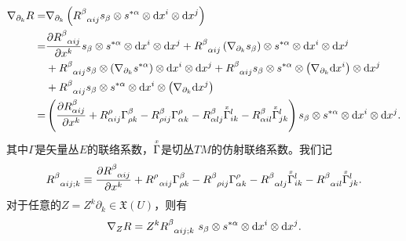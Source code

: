 \begin{align*}
	\nabla_{\partial_k} R = & \nabla_{\partial_k}\left(	R_{\hphantom{\alpha}\alpha i j}^\beta 
	s_\beta \otimes s^{*\alpha}\otimes {\rm d}x^i \otimes {\rm d}x^j \right) \\
	=& \frac{\partial R_{\hphantom{\alpha}\alpha i j}^\beta }{\partial x^k}
	s_\beta \otimes s^{*\alpha}\otimes {\rm d}x^i \otimes {\rm d}x^j 
	+ R_{\hphantom{\alpha}\alpha i j}^\beta \left( \nabla_{\partial_k} s_\beta \right)
	\otimes s^{*\alpha}\otimes {\rm d}x^i \otimes {\rm d}x^j \\
	& + R_{\hphantom{\alpha}\alpha i j}^\beta s_\beta \otimes 
	\left( \nabla_{\partial_k} s^{*\alpha} \right) \otimes {\rm d}x^i \otimes {\rm d}x^j 
	+ R_{\hphantom{\alpha}\alpha i j}^\beta s_\beta \otimes s^{*\alpha}\otimes  
	\left( \nabla_{\partial_k} {\rm d}x^i \right) \otimes  {\rm d}x^j \\
	&+ R_{\hphantom{\alpha}\alpha i j}^\beta s_\beta \otimes s^{*\alpha}\otimes {\rm d}x^i 
	\otimes \left( \nabla_{\partial_k} {\rm d}x^j \right) \\
	=&\left( \frac{\partial R_{\alpha i j}^\beta }{\partial x^k}
	+ R_{\alpha i j}^\rho \Gamma^\beta_{\rho k}
	- R_{\rho i j}^\beta \Gamma^\rho_{\alpha k}
	- R_{\alpha l j}^\beta \oversetmy{x}{\Gamma}^l_{i k}
	- R_{\alpha i l}^\beta \oversetmy{x}{\Gamma}^l_{j k}	\right)
	s_\beta \otimes s^{*\alpha}\otimes {\rm d}x^i \otimes {\rm d}x^j .
\end{align*}
其中$\Gamma$是矢量丛$E$的联络系数，$\oversetmy{x}{\Gamma}$是切丛$TM$的仿射联络系数。我们记
\begin{equation}\label{chfb:eqn_RijDk}
	 R_{\hphantom{\alpha}\alpha i j ; k}^\beta \equiv 
	\frac{\partial R_{\hphantom{\alpha}\alpha i j}^\beta }{\partial x^k}
	+ R_{\hphantom{\alpha}\alpha i j}^\rho \Gamma^\beta_{\rho k}
	- R_{\hphantom{\alpha}\rho i j}^\beta \Gamma^\rho_{\alpha k}
	- R_{\hphantom{\alpha}\alpha l j}^\beta \oversetmy{x}{\Gamma}^l_{i k}
	- R_{\hphantom{\alpha}\alpha i l}^\beta \oversetmy{x}{\Gamma}^l_{j k} .
\end{equation}
对于任意的$ Z = Z^k \partial_k \in \mathfrak{X}(U)$，则有
\begin{equation}\label{chfb:eqn_DZR}
	\nabla_{Z} R = Z^k R_{\hphantom{\alpha}\alpha i j ; k}^\beta \ 
	s_\beta \otimes s^{*\alpha}\otimes {\rm d}x^i \otimes {\rm d}x^j .
\end{equation}

